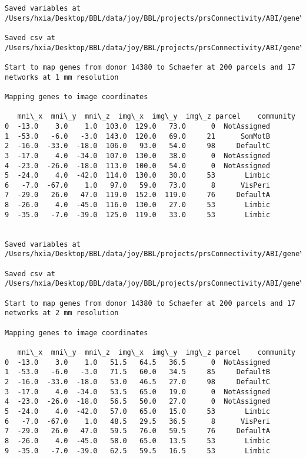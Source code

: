 \documentclass[11pt]{article}
\begin{document}
\begin{Verbatim}[commandchars=\\\{\}]
Saved variables at /Users/hxia/Desktop/BBL/data/joy/BBL/projects/prsConnectivity/ABI/gene\_mapping/14380donor\_200Parcels\_7Network\_2mm.pkl

Saved csv at /Users/hxia/Desktop/BBL/data/joy/BBL/projects/prsConnectivity/ABI/gene\_mapping/14380donor\_200Parcels\_7Network\_2mm.csv

Start to map genes from donor 14380 to Schaefer at 200 parcels and 17 networks at 1 mm resolution

Mapping genes to image coordinates

   mni\_x  mni\_y  mni\_z  img\_x  img\_y  img\_z parcel    community
0  -13.0    3.0    1.0  103.0  129.0   73.0      0  NotAssigned
1  -53.0   -6.0   -3.0  143.0  120.0   69.0     21      SomMotB
2  -16.0  -33.0  -18.0  106.0   93.0   54.0     98     DefaultC
3  -17.0    4.0  -34.0  107.0  130.0   38.0      0  NotAssigned
4  -23.0  -26.0  -18.0  113.0  100.0   54.0      0  NotAssigned
5  -24.0    4.0  -42.0  114.0  130.0   30.0     53       Limbic
6   -7.0  -67.0    1.0   97.0   59.0   73.0      8      VisPeri
7  -29.0   26.0   47.0  119.0  152.0  119.0     76     DefaultA
8  -26.0    4.0  -45.0  116.0  130.0   27.0     53       Limbic
9  -35.0   -7.0  -39.0  125.0  119.0   33.0     53       Limbic


Saved variables at /Users/hxia/Desktop/BBL/data/joy/BBL/projects/prsConnectivity/ABI/gene\_mapping/14380donor\_200Parcels\_17Network\_1mm.pkl

Saved csv at /Users/hxia/Desktop/BBL/data/joy/BBL/projects/prsConnectivity/ABI/gene\_mapping/14380donor\_200Parcels\_17Network\_1mm.csv

Start to map genes from donor 14380 to Schaefer at 200 parcels and 17 networks at 2 mm resolution

Mapping genes to image coordinates

   mni\_x  mni\_y  mni\_z  img\_x  img\_y  img\_z parcel    community
0  -13.0    3.0    1.0   51.5   64.5   36.5      0  NotAssigned
1  -53.0   -6.0   -3.0   71.5   60.0   34.5     85     DefaultB
2  -16.0  -33.0  -18.0   53.0   46.5   27.0     98     DefaultC
3  -17.0    4.0  -34.0   53.5   65.0   19.0      0  NotAssigned
4  -23.0  -26.0  -18.0   56.5   50.0   27.0      0  NotAssigned
5  -24.0    4.0  -42.0   57.0   65.0   15.0     53       Limbic
6   -7.0  -67.0    1.0   48.5   29.5   36.5      8      VisPeri
7  -29.0   26.0   47.0   59.5   76.0   59.5     76     DefaultA
8  -26.0    4.0  -45.0   58.0   65.0   13.5     53       Limbic
9  -35.0   -7.0  -39.0   62.5   59.5   16.5     53       Limbic



\end{Verbatim}
\end{document}
